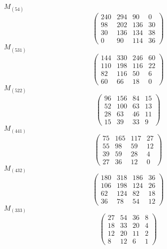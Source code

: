\documentclass[12pt,reqno]{amsart}
\begin{document}
$M_{(54)}$                             $$ \begin{pmatrix} 
                        240 & 294 & 90 & 0 \\[6pt]
                        98 & 202 & 136 & 30 \\[6pt]
                        30 & 136 & 134 & 38 \\[6pt]
                           0 & 90 & 114 & 36
                              \end{pmatrix} $$ 
$M_{(531)}$                             $$ \begin{pmatrix} 
                       144 & 330 & 246 & 60 \\[6pt]
                       110 & 198 & 116 & 22 \\[6pt]
                         82 & 116 & 50 & 6 \\[6pt]
                           60 & 66 & 18 & 0
                              \end{pmatrix} $$ 
$M_{(522)}$                             $$ \begin{pmatrix} 
                        96 & 156 & 84 & 15 \\[6pt]
                        52 & 100 & 63 & 13 \\[6pt]
                         28 & 63 & 46 & 11 \\[6pt]
                           15 & 39 & 33 & 9
                              \end{pmatrix} $$ 
$M_{(441)}$                             $$ \begin{pmatrix} 
                        75 & 165 & 117 & 27 \\[6pt]
                         55 & 98 & 59 & 12 \\[6pt]
                         39 & 59 & 28 & 4 \\[6pt]
                           27 & 36 & 12 & 0
                              \end{pmatrix} $$ 
$M_{(432)}$                             $$ \begin{pmatrix} 
                       180 & 318 & 186 & 36 \\[6pt]
                       106 & 198 & 124 & 26 \\[6pt]
                        62 & 124 & 82 & 18 \\[6pt]
                           36 & 78 & 54 & 12
                              \end{pmatrix} $$ 
$M_{(333)}$                             $$ \begin{pmatrix} 
                         27 & 54 & 36 & 8 \\[6pt]
                         18 & 33 & 20 & 4 \\[6pt]
                         12 & 20 & 11 & 2 \\[6pt]
                            8 & 12 & 6 & 1
                              \end{pmatrix} $$ 
\end{document}
